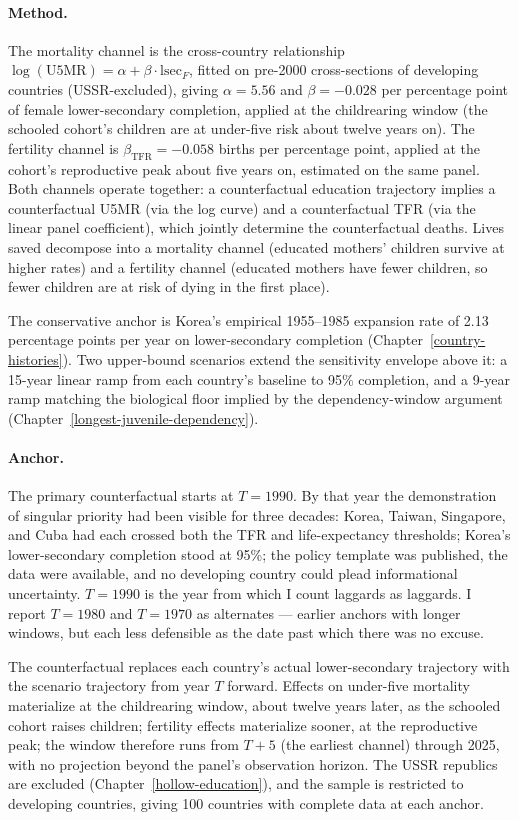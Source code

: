\documentclass[12pt,letterpaper]{article}
\begin{document}
\paragraph{Method.} The mortality channel is the cross-country
relationship $\log(\text{U5MR}) = \alpha + \beta \cdot
\text{lsec}_F$, fitted on pre-2000 cross-sections of developing
countries (USSR-excluded), giving $\alpha = 5.56$ and
$\beta = -0.028$ per percentage point of female lower-secondary
completion, applied at the childrearing window (the schooled cohort's
children are at under-five risk about twelve years on). The fertility
channel is $\beta_{\text{TFR}} = -0.058$ births per percentage point,
applied at the cohort's reproductive peak about five years on,
estimated on the same panel. Both channels operate together: a
counterfactual education trajectory implies a counterfactual U5MR
(via the log curve) and a counterfactual TFR (via the linear panel
coefficient), which jointly determine the counterfactual deaths.
Lives saved decompose into a mortality channel (educated mothers'
children survive at higher rates) and a fertility channel (educated
mothers have fewer children, so fewer children are at risk of dying
in the first place).

The conservative anchor is Korea's empirical 1955--1985 expansion
rate of 2.13 percentage points per year on lower-secondary
completion (Chapter~\ref{country-histories}). Two upper-bound
scenarios extend the sensitivity envelope above it: a 15-year linear ramp from each
country's baseline to 95\% completion, and a 9-year ramp matching
the biological floor implied by the dependency-window argument
(Chapter~\ref{longest-juvenile-dependency}).

\paragraph{Anchor.} The primary counterfactual starts at $T = 1990$.
By that year the demonstration of singular priority had been visible
for three decades: Korea, Taiwan, Singapore, and Cuba had each
crossed both the TFR and life-expectancy thresholds; Korea's
lower-secondary completion stood at 95\%; the policy template was
published, the data were available, and no developing country could
plead informational uncertainty. $T = 1990$ is the year from which
I count laggards as laggards. I report $T = 1980$ and $T = 1970$ as
alternates --- earlier anchors with longer windows, but each less
defensible as the date past which there was no excuse.

The counterfactual replaces each country's actual lower-secondary
trajectory with the scenario trajectory from year $T$ forward.
Effects on under-five mortality materialize at the childrearing
window, about twelve years later, as the schooled cohort raises
children; fertility effects materialize sooner, at the reproductive
peak; the window therefore runs from $T+5$ (the earliest channel)
through 2025, with no projection beyond the panel's
observation horizon. The USSR republics are excluded
(Chapter~\ref{hollow-education}), and the sample is restricted to
developing countries, giving 100 countries with complete data at
each anchor.
\end{document}
